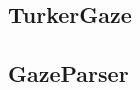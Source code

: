 \documentclass[12pt]{article}
\begin{document}
\subsection{TurkerGaze}

\subsection{GazeParser}




\end{document}
